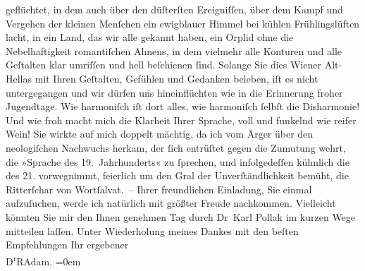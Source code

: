 \begin{ledgroupsized}[t]{13cm}
               geflüchtet, in dem auch über den düſterſten Ereigniſſen, über dem Kampf und Vergehen
                  der kleinen Menſchen ein ewigblauer
               Himmel bei kühlen Frühlingslüften lacht, in ein Land, das wir alle gekannt haben, ein
               Orplid ohne die Nebelhaftigkeit romantiſchen Ahnens, in dem vielmehr alle Konturen
               und alle Geſtalten klar umriſſen und hell beſchienen ſind. Solange Sie dies Wiener Alt-Hellas mit Ihren Geſtalten, Gefühlen und Gedanken beleben, iſt es nicht
               untergegangen und wir dürfen uns hineinflüchten wie in die Erinnerung froher
               Jugendtage. Wie harmoniſch iſt dort alles, wie harmoniſch ſelbſt die Disharmonie! Und
               wie froh macht mich die Klarheit Ihrer {\pb}Sprache, voll und funkelnd wie reifer Wein! Sie wirkte auf mich doppelt mächtig, da
               ich vom Ärger über den neologiſchen Nachwuchs herkam, der ſich entrüſtet gegen die
               Zumutung wehrt, die »Sprache des 19. Jahrhunderts« zu ſprechen, und infolgedeſſen
               kühnlich die des 21. vorwegnimmt, feierlich um den Gral der Unverſtändlichkeit
               bemüht, die Ritterſchar von Wortſalvat. –\pend
           \pstart
           Ihrer freundlichen Einladung, Sie einmal aufzuſuchen, werde ich natürlich mit größter
               Freude nachkommen. Vielleicht könnten Sie mir den Ihnen genehmen Tag durch Dr Karl Pollak im kurzen Wege mitteilen
               laſſen.\pend
           \pstart
           {\pb}Unter Wiederholung meines Dankes mit den
               beſten Empfehlungen\pend
           \pstart
           Ihr ergebener{\\[\baselineskip]}\spacefill\mbox{D\textsuperscript{r}RAdam.}\pend
           \leftskip=0em{}
         
         \endnumbering{}\end{ledgroupsized}  \newcommand{\dateiname}{L02485}\newcommand{\titel}{Robert Adam an Arthur Schnitzler, 1. 5. 1927}\newcommand{\editorInnen}{Martin Anton Müller und Gerd-Hermann Susen}
      